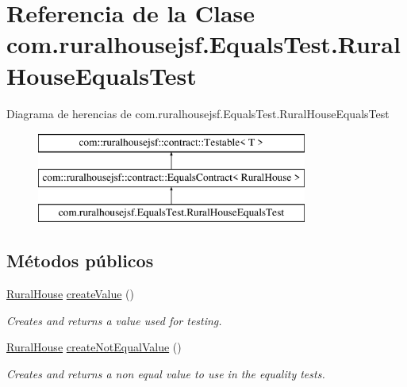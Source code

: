 \hypertarget{classcom_1_1ruralhousejsf_1_1_equals_test_1_1_rural_house_equals_test}{}\section{Referencia de la Clase com.\+ruralhousejsf.\+Equals\+Test.\+Rural\+House\+Equals\+Test}
\label{classcom_1_1ruralhousejsf_1_1_equals_test_1_1_rural_house_equals_test}
Diagrama de herencias de com.\+ruralhousejsf.\+Equals\+Test.\+Rural\+House\+Equals\+Test\begin{figure}[H]
\begin{center}
\leavevmode
\includegraphics[height=3.000000cm]{d7/def/classcom_1_1ruralhousejsf_1_1_equals_test_1_1_rural_house_equals_test}
\end{center}
\end{figure}
\subsection*{Métodos públicos}
\begin{DoxyCompactItemize}
\item 
\mbox{\hyperlink{classcom_1_1ruralhousejsf_1_1domain_1_1_rural_house}{Rural\+House}} \mbox{\hyperlink{classcom_1_1ruralhousejsf_1_1_equals_test_1_1_rural_house_equals_test_abcab55b3e63c8d5511f04e395ff0f111}{create\+Value}} ()
\begin{DoxyCompactList}\small\item\em Creates and returns a value used for testing. \end{DoxyCompactList}\item 
\mbox{\hyperlink{classcom_1_1ruralhousejsf_1_1domain_1_1_rural_house}{Rural\+House}} \mbox{\hyperlink{classcom_1_1ruralhousejsf_1_1_equals_test_1_1_rural_house_equals_test_a4021dc1a2dacaed55fa5bacec7ca6165}{create\+Not\+Equal\+Value}} ()
\begin{DoxyCompactList}\small\item\em Creates and returns a non equal value to use in the equality tests. \end{DoxyCompactList}\end{DoxyCompactItemize}


